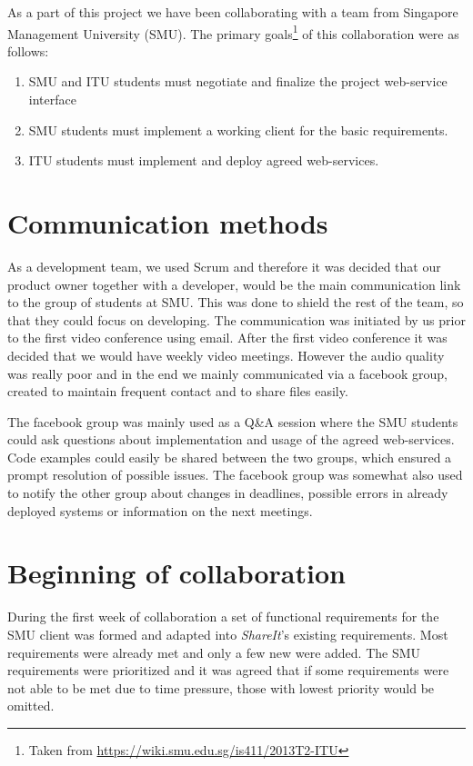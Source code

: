 \documentclass[../report.tex]{subfiles}
\begin{document}
\graphicspath{{img/}{../img/}}

As a part of this project we have been collaborating with a team from Singapore Management University (SMU). The primary goals\footnote{Taken from \url{https://wiki.smu.edu.sg/is411/2013T2-ITU}} of this collaboration were as follows:

\begin{enumerate}[label=\bfseries G\arabic*:]
\item SMU and ITU students must negotiate and finalize the project web-service interface
\item SMU students must implement a working client for the basic requirements.
\item ITU students must implement and deploy agreed web-services.
\end{enumerate}

\section{Communication methods}
As a development team, we used Scrum and therefore it was decided that our product owner together with a developer, would be the main communication link to the group of students at SMU.
This was done to shield the rest of the team, so that they could focus on developing.
The communication was initiated by us prior to the first video conference using email.
After the first video conference it was decided that we would have weekly video meetings.
However the audio quality was really poor and in the end we mainly communicated via a facebook group, created to maintain frequent contact and to share files easily.

The facebook group was mainly used as a Q\&A session where the SMU students could ask questions about implementation and usage of the agreed web-services. Code examples could easily be shared between the two groups, which ensured a prompt resolution of possible issues. The facebook group was somewhat also used to notify the other group about changes in deadlines, possible errors in already deployed systems or information on the next meetings.


\section{Beginning of collaboration}
During the first week of collaboration a set of functional requirements for the SMU client was formed and adapted into \textit{ShareIt}'s existing requirements. 
Most requirements were already met and only a few new were added. 
The SMU requirements were prioritized and it was agreed that if some requirements were not able to be met due to time pressure, those with lowest priority would be omitted.
\end{document}

